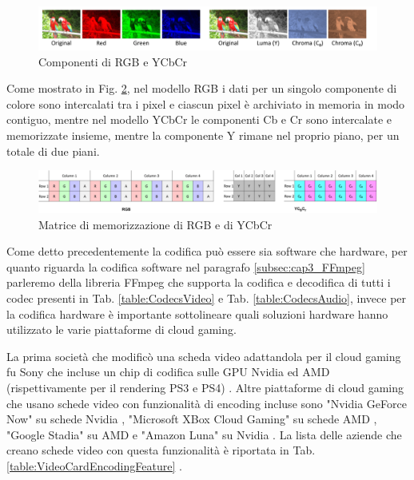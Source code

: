 \begin{figure}[H]
	\includegraphics[width=\linewidth]{immagini/RGB_YCbCr}
	\caption{Componenti di RGB e YCbCr}
	\label{fig:RGB_YCbCr}
\end{figure}

Come mostrato in Fig. \ref{fig:RGB_YCbCr_matrix}, nel modello RGB i dati per un singolo componente di colore sono intercalati tra i pixel e ciascun pixel è archiviato in memoria in modo contiguo, mentre nel modello YCbCr le componenti Cb e Cr sono intercalate e memorizzate insieme, mentre la componente Y rimane nel proprio piano, per un totale di due piani.

\begin{figure}[H]
	\includegraphics[width=\linewidth]{immagini/RGB_YCbCr_matrix}
	\caption{Matrice di memorizzazione di RGB e di YCbCr}
	\label{fig:RGB_YCbCr_matrix}
\end{figure}

Come detto precedentemente la codifica può essere sia software che hardware, per quanto riguarda la codifica software nel paragrafo \ref{subsec:cap3_FFmpeg} parleremo della libreria FFmpeg che supporta la codifica e decodifica di tutti i codec presenti in Tab. \ref{table:CodecsVideo} e Tab. \ref{table:CodecsAudio}, invece per la codifica hardware è importante sottolineare quali soluzioni hardware hanno utilizzato le varie piattaforme di cloud gaming.

La prima società che modificò una scheda video adattandola per il cloud gaming fu Sony che incluse un chip di codifica sulle GPU Nvidia ed AMD (rispettivamente per il rendering PS3 e PS4) \parencite{PlayStation_Now_Chip}. Altre piattaforme di cloud gaming che usano schede video con funzionalità di encoding incluse sono "Nvidia GeForce Now" su schede Nvidia \parencite{GeForce_Now}, "Microsoft XBox Cloud Gaming" su schede AMD \parencite{xCloudBlade}, "Google Stadia" su AMD \parencite{Google_Stadia_Server} e "Amazon Luna" su Nvidia \parencite{Amazon_Luna_GPU}. La lista delle aziende che creano schede video con questa funzionalità è riportata in Tab. \ref{table:VideoCardEncodingFeature} \parencite{GCNArchitecture} \parencite{IntelQuickSyncVideo} \parencite{NVIDIAVideoCodecSDK} \parencite{Hexagon_DSP_SDK}.

